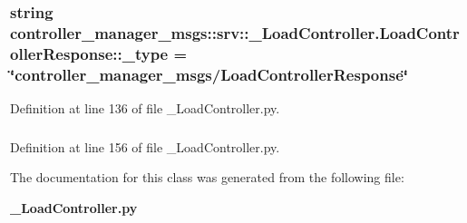 \subsubsection[{\-\_\-type}]{\setlength{\rightskip}{0pt plus 5cm}string {\bf controller\-\_\-manager\-\_\-msgs\-::srv\-::\-\_\-\-Load\-Controller.\-Load\-Controller\-Response\-::\-\_\-type} = \char`\"{}controller\-\_\-manager\-\_\-msgs/{\bf \-Load\-Controller\-Response}\char`\"{}\hspace{0.3cm}{\ttfamily  [static, private]}}\label{classcontroller__manager__msgs_1_1srv_1_1__LoadController_1_1LoadControllerResponse_a37a23480e2b9a0756900b336e0952ef6}


\-Definition at line 136 of file \-\_\-\-Load\-Controller.\-py.

\subsubsection[{ok}]{}\label{classcontroller__manager__msgs_1_1srv_1_1__LoadController_1_1LoadControllerResponse_a75ae92d36c9706031b6c4b5db46393dd}


\-Definition at line 156 of file \-\_\-\-Load\-Controller.\-py.



\-The documentation for this class was generated from the following file\-:\begin{DoxyCompactItemize}
\item 
{\bf \-\_\-\-Load\-Controller.\-py}\end{DoxyCompactItemize}
